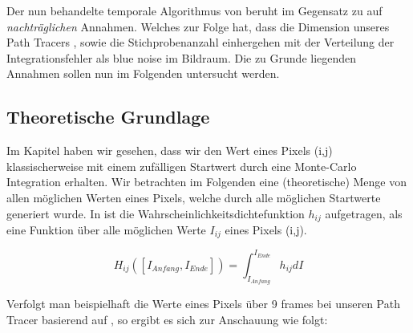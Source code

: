 Der nun behandelte temporale Algorithmus von \cite{hal02158423} beruht 
im Gegensatz zu \cite{georgiev2016blue} auf \textit{nachträglichen} 
Annahmen. Welches zur Folge hat, dass die Dimension unseres Path Tracers
, sowie die Stichprobenanzahl einhergehen 
mit der Verteilung der Integrationsfehler als blue noise im Bildraum.
Die zu Grunde liegenden Annahmen sollen nun im Folgenden untersucht werden.

\subsection{Theoretische Grundlage}

Im Kapitel  haben wir gesehen, dass 
wir den Wert eines Pixels (i,j) klassischerweise mit einem zufälligen
Startwert durch eine Monte-Carlo Integration erhalten. Wir betrachten im
Folgenden eine (theoretische) Menge von allen möglichen Werten eines 
Pixels, welche durch alle möglichen Startwerte generiert wurde.
In  ist die Wahrscheinlichkeitsdichtefunktion
$h_{ij}$ aufgetragen, als eine Funktion über alle möglichen Werte 
$I_{ij}$ eines Pixels (i,j).

\begin{equation}\label{eq:Pixel Schätzung Wahrscheinlichkeitsdichtefunktion}
    H_{ij}([I_{Anfang},I_{Ende}]) = \int_{I_{Anfang}}^{I_{Ende}} h_{ij} dI
\end{equation}

Verfolgt man beispielhaft die Werte eines Pixels über 9 frames bei unseren Path Tracer 
basierend auf \cite{Benty18}, so ergibt es sich zur Anschauung wie folgt:

